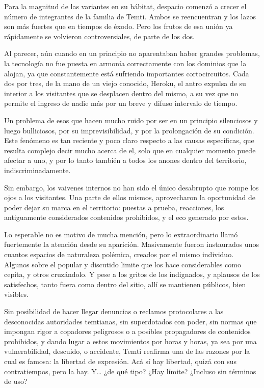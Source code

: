 \documentclass[
]{book}
\begin{document}
Para la magnitud de las variantes en su hábitat, despacio comenzó a crecer el número de integrantes de la familia de Temti. Ambos se reencuentran y los lazos son más fuertes que en tiempos de éxodo. Pero los frutos de esa unión ya rápidamente se volvieron controversiales, de parte de los dos.

Al parecer, aún cuando en un principio no aparentaban haber grandes problemas, la tecnología no fue puesta en armonía correctamente con los dominios que la alojan, ya que constantemente está sufriendo importantes cortocircuitos. Cada dos por tres, de la mano de un viejo conocido, Heroku, el antro expulsa de su interior a los visitantes que se desplacen dentro del mismo, a su vez que no permite el ingreso de nadie más por un breve y difuso intervalo de tiempo.

Un problema de esos que hacen mucho ruido por ser en un principio silenciosos y luego bulliciosos, por su imprevisibilidad, y por la prolongación de su condición. Este fenómeno es tan reciente y poco claro respecto a las causas especificas, que resulta complejo decir mucho acerca de el, solo que en cualquier momento puede afectar a uno, y por lo tanto también a todos los anones dentro del territorio, indiscriminadamente.

Sin embargo, los vaivenes internos no han sido el único desabrupto que rompe los ojos a los visitantes. Una parte de ellos mismos, aprovecharon la oportunidad de poder dejar su marca en el territorio: puestas a prueba, reacciones, los antiguamente considerados contenidos prohibidos, y el eco generado por estos.

Lo esperable no es motivo de mucha mención, pero lo extraordinario llamó fuertemente la atención desde su aparición. Masivamente fueron instaurados unos cuantos espacios de naturaleza polémica, creados por el mismo individuo. Algunos sobre el popular y discutido limite que los hace considerables como cepita, y otros cruzándolo. Y pese a los gritos de los indignados, y aplausos de los satisfechos, tanto fuera como dentro del sitio, allí se mantienen públicos, bien visibles.

Sin posibilidad de hacer llegar denuncias o reclamos protocolares a las desconocidas autoridades temtianas, sin superdotados con poder, sin normas que impongan rigor a copadores peligrosos o a posibles propagadores de contenidos prohibidos, y dando lugar a estos movimientos por horas y horas, ya sea por una vulnerabilidad, descuido, o accidente, Temti reafirma una de las razones por la cual es famosa: la libertad de expresión. Acá sí hay libertad, quizá con sus contratiempos, pero la hay. Y\ldots{} ¿de qué tipo? ¿Hay límite? ¿Incluso sin términos de uso?
\end{document}
